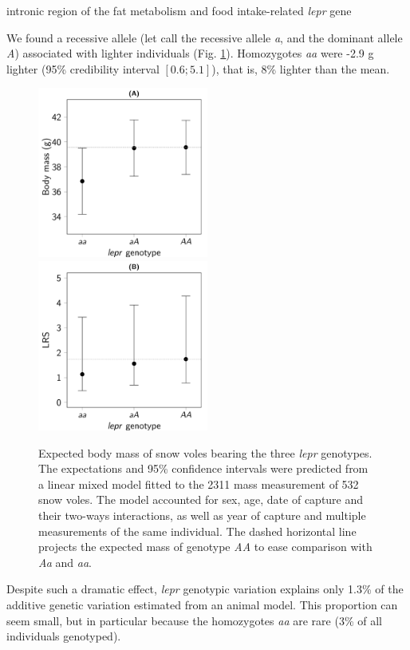 intronic region of the fat metabolism and food intake-related \emph{lepr} gene

We found a recessive allele (let call the recessive allele \emph{a}, and the dominant allele \emph{A}) associated with lighter individuals (Fig. \ref{fig:leprpheno}). Homozygotes \emph{aa} were -2.9 g lighter (95\% credibility interval $[0.6;5.1]$), that is, 8\% lighter than the mean. 


\begin{figure}[ht]
	\includegraphics[width=0.5\textwidth]{FiguresGeneral/PhenoEffect-1}
	\includegraphics[width=0.5\textwidth]{FiguresGeneral/FitnessEffect-1}
	\caption{Expected body mass of snow voles bearing the three \emph{lepr} genotypes. The expectations and 95\% confidence intervals were predicted from a linear mixed model fitted to the 2311 mass measurement of 532 snow voles. The model accounted for sex, age, date of capture and their two-ways interactions, as well as year of capture and multiple measurements of the same individual. The dashed horizontal line projects the expected mass of genotype \emph{AA} to ease comparison with \emph{Aa} and \emph{aa}.}
	\label{fig:leprpheno}
\end{figure}

Despite such a dramatic effect, \emph{lepr} genotypic variation explains only 1.3\% of the additive genetic variation estimated from an animal model. This proportion can seem small, but in particular because the homozygotes \emph{aa} are rare (3\% of all individuals genotyped).

